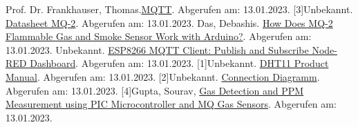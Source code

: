 \documentclass[a4paper, 11pt]{article}
\begin{document}
Prof. Dr. Frankhauser, Thomas.\href{https://fankhauser.io/topics/mqtt/}{MQTT}. Abgerufen am: 13.01.2023.
[3]Unbekannt. \href{http://sandboxelectronics.com/files/SEN-000004/MQ-2.pdf}{Datasheet MQ-2}. Abgerufen am: 13.01.2023.
Das, Debashis. \href{https://circuitdigest.com/microcontroller-projects/interfacing-mq2-gas-sensor-with-arduino}{How Does MQ-2 Flammable Gas and Smoke Sensor Work with Arduino?}. Abgerufen am: 13.01.2023.
Unbekannt. \href{https://www.survivingwithandroid.com/esp8266-mqtt-client-publish-subscribe/}{ESP8266 MQTT Client: Publish and Subscribe Node-RED Dashboard}. Abgerufen am: 13.01.2023.
[1]Unbekannt. \href{https://components101.com/sites/default/files/component_datasheet/DHT11-Temperature-Sensor.pdf}{DHT11 Product Manual}. Abgerufen am: 13.01.2023.
[2]Unbekannt. \href{https://components101.com/sites/default/files/inline-images/Circuit-using-DHT11%E2%80%93Temperature-Sensor.png}{Connection Diagramm}. Abgerufen am: 13.01.2023.
[4]Gupta, Sourav, \href{https://circuitdigest.com/sites/default/files/inlineimages/u2/MQ6-Gas-Sensor-Pinout_0.png}{Gas Detection and PPM Measurement using PIC Microcontroller and MQ Gas Sensors}. Abgerufen am: 13.01.2023.
\end{document}

